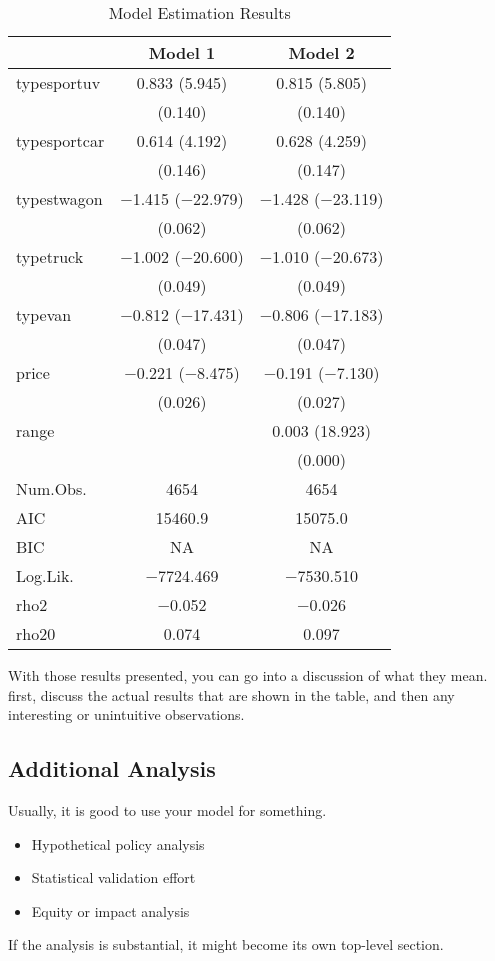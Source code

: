 \documentclass[3p, authoryear]{elsarticle} %
\providecommand{\tightlist}{%
  \setlength{\itemsep}{0pt}\setlength{\parskip}{0pt}}
\begin{document}
\begin{table}

\caption{\label{tab:estimation-results}Model Estimation Results}
\centering
\begin{tabular}[t]{lcc}
\toprule
  & Model 1 & Model 2\\
\midrule
typesportuv & \num{0.833} (\num{5.945}) & \num{0.815} (\num{5.805})\\
 & (\num{0.140}) & (\num{0.140})\\
typesportcar & \num{0.614} (\num{4.192}) & \num{0.628} (\num{4.259})\\
 & (\num{0.146}) & (\num{0.147})\\
typestwagon & \num{-1.415} (\num{-22.979}) & \num{-1.428} (\num{-23.119})\\
 & (\num{0.062}) & (\num{0.062})\\
typetruck & \num{-1.002} (\num{-20.600}) & \num{-1.010} (\num{-20.673})\\
 & (\num{0.049}) & (\num{0.049})\\
typevan & \num{-0.812} (\num{-17.431}) & \num{-0.806} (\num{-17.183})\\
 & (\num{0.047}) & (\num{0.047})\\
price & \num{-0.221} (\num{-8.475}) & \num{-0.191} (\num{-7.130})\\
 & (\num{0.026}) & (\num{0.027})\\
range &  & \num{0.003} (\num{18.923})\\
 &  & (\num{0.000})\\
\midrule
Num.Obs. & \num{4654} & \num{4654}\\
AIC & \num{15460.9} & \num{15075.0}\\
BIC & \num{NA} & \num{NA}\\
Log.Lik. & \num{-7724.469} & \num{-7530.510}\\
rho2 & \num{-0.052} & \num{-0.026}\\
rho20 & \num{0.074} & \num{0.097}\\
\bottomrule
\end{tabular}
\end{table}

With those results presented, you can go into a discussion of what they mean.
first, discuss the actual results that are shown in the table, and then any
interesting or unintuitive observations.

\hypertarget{additional-analysis}{%
\subsection{Additional Analysis}\label{additional-analysis}}

Usually, it is good to use your model for something.

\begin{itemize}
\tightlist
\item
  Hypothetical policy analysis
\item
  Statistical validation effort
\item
  Equity or impact analysis
\end{itemize}

If the analysis is substantial, it might become its own top-level section.


\end{document}
